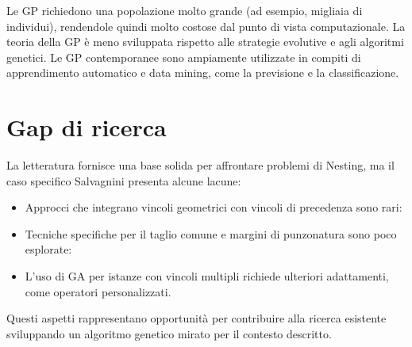 Le GP richiedono una popolazione molto grande (ad esempio, migliaia di individui), rendendole quindi molto costose dal punto di vista computazionale. La teoria della GP è meno sviluppata rispetto alle strategie evolutive e agli algoritmi genetici. Le GP contemporanee sono ampiamente utilizzate in compiti di apprendimento automatico e data mining, come la previsione e la classificazione.

\section{Gap di ricerca}

La letteratura fornisce una base solida per affrontare problemi di Nesting, ma il caso specifico Salvagnini presenta alcune lacune:

\begin{itemize}
    \item Approcci che integrano vincoli geometrici con vincoli di precedenza sono rari:
    \item Tecniche specifiche per il taglio comune e margini di punzonatura sono poco esplorate:
    \item L'uso di GA per istanze con vincoli multipli richiede ulteriori adattamenti, come operatori personalizzati.
\end{itemize}

Questi aspetti rappresentano opportunità per contribuire alla ricerca esistente sviluppando un algoritmo genetico mirato per il contesto descritto.